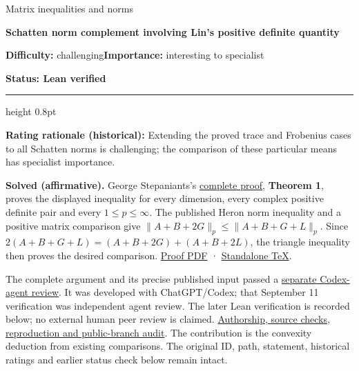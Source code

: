\documentclass[11pt,a4paper]{article}
\makeatletter
\renewcommand{\subsection}{\Needspace{4\baselineskip}\@startsection{subsection}{2}{0pt}{9pt plus 1pt minus 1pt}{3pt}{\sffamily\bfseries\normalsize\color{ink}}}
\makeatother
\begin{document}
{\sffamily\small\color{muted}Matrix inequalities and norms\par}
\vspace{3pt}
{\raggedright{}\sffamily\bfseries\fontsize{21}{24}\selectfont\color{ink}Schatten
norm complement involving Lin's positive definite quantity\par}
\vspace{7pt}
{\sffamily\small\textbf{Difficulty:} challenging\quad\textbf{Importance:} interesting
to specialist\par}
{\sffamily\small\bfseries\color{accent}Status: Lean verified\par}
\vspace{4pt}
{\color{accent}\hrule height 0.8pt}
\vspace{6pt}
\textbf{Rating rationale (historical):} Extending the proved trace and
Frobenius cases to all Schatten norms is challenging; the comparison of
these particular means has specialist importance.

\subsection{Resolution --- 2026-09-11}\label{resolution-2026-09-11}

\textbf{Solved (affirmative).} George Stepaniants's
\href{https://github.com/ajt60gaibb/OpenProblemsInNLA/blob/main/matrix-inequalities-and-norms/MI-24/solution.md}{complete
proof}, \textbf{Theorem 1}, proves the displayed inequality for every
dimension, every complex positive definite pair and every
\(1\le p\le\infty\). The published Heron norm inequality and a positive
matrix comparison give \(\|A+B+2G\|_p\le\|A+B+G+L\|_p\). Since
\(2(A+B+G+L)=(A+B+2G)+(A+B+2L)\), the triangle inequality then proves
the desired comparison.
\href{https://github.com/ajt60gaibb/OpenProblemsInNLA/blob/main/matrix-inequalities-and-norms/MI-24/solution.pdf}{Proof
PDF} ·
\href{https://github.com/ajt60gaibb/OpenProblemsInNLA/blob/main/matrix-inequalities-and-norms/MI-24/solution.tex}{Standalone
TeX}.

The complete argument and its precise published input passed a
\href{https://github.com/ajt60gaibb/OpenProblemsInNLA/blob/main/references/stepaniants-mi24-2026-09-11/verification/reviews/MI-24-review.md}{separate
Codex-agent review}. It was developed with ChatGPT/Codex; that September
11 verification was independent agent review. The later Lean
verification is recorded below; no external human peer review is
claimed.
\href{https://github.com/ajt60gaibb/OpenProblemsInNLA/blob/main/references/stepaniants-mi24-2026-09-11/README.md}{Authorship,
source checks, reproduction and public-branch audit}. The contribution
is the convexity deduction from existing comparisons. The original ID,
path, statement, historical ratings and earlier status check below
remain intact.
\end{document}

